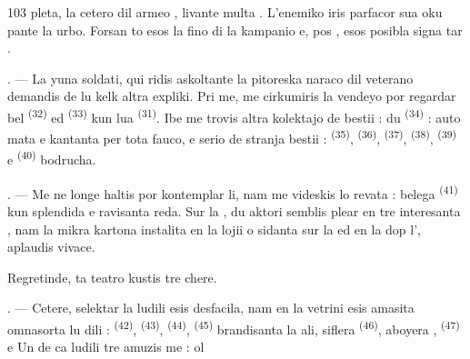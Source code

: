 \begin{VUpage}[105]{103}
\VUcontinue
pleta, la cetero dil armeo , livante multa\nl
{}. L'enemiko iris parfacor sua  oku\cc
pante la urbo. Forsan to esos la fino di la\nl
kampanio e, pos , esos posibla signa\cc
tar .

\VUsaut{4.4mm}
\VUsaut{2.8mm}

. --- La yuna soldati, qui ridis askoltante\nl
la pitoreska naraco dil veterano demandis de\nl
lu kelk altra expliki. Pri me, me cirkumiris la\nl
vendeyo por regardar bel  \textsuperscript{(32)} ed\nl
{} \textsuperscript{(33)} kun lua  \textsuperscript{(31)}. Ibe me trovis altra\nl
kolektajo de bestii : du  \textsuperscript{(34)} : auto\cc
mata  e  kantanta per tota fauco,\nl
e serio de stranja bestii :  \textsuperscript{(35)},\nl
{} \textsuperscript{(36)},  \textsuperscript{(37)},  \textsuperscript{(38)},  \textsuperscript{(39)}\nl
e  \textsuperscript{(40)} bodrucha.

. --- Me ne longe haltis por kontemplar li,\nl
nam me videskis lo revata : belega \cc
{} \textsuperscript{(41)} kun splendida  e ravisanta\nl
{} reda. Sur la , du aktori semblis\nl
plear  en tre interesanta , nam la\nl
mikra  kartona instalita en la lojii o\nl
sidanta sur la  ed en la  dop\nl
l', aplaudis vivace.

\VUblancAlinea
Regretinde, ta teatro kustis tre chere.

. --- Cetere, selektar la ludili esis desfacila,\nl
nam en la vetrini esis amasita omnasorta lu\cc
dili :  \textsuperscript{(42)},  \textsuperscript{(43)},  \textsuperscript{(44)},\nl
{} \textsuperscript{(45)} brandisanta la ali, siflera  \textsuperscript{(46)},\nl
aboyera ,  \textsuperscript{(47)} e \cc
{} Un de ca ludili tre amuzis me : ol
\parplein
\end{VUpage}

